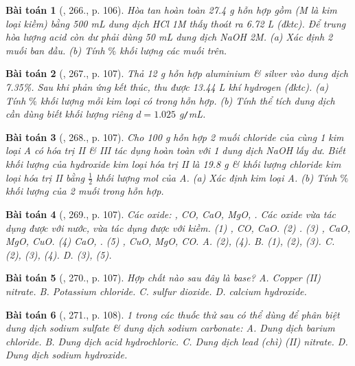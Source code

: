 \documentclass{article}
\newtheorem{baitoan}{Bài toán}
\begin{document}
\begin{baitoan}[\cite{Nguyen_Buu_Can_500_BT_Hoa_Hoc_THCS}, 266., p. 106]
	Hòa tan hoàn toàn {\rm27.4 g} hỗn hợp gồm {\rm{}} ({\rm M} là kim loại kiềm) bằng {\rm500 mL} dung dịch {\rm HCl 1M} thấy thoát ra {\rm6.72 L } (đktc). Để trung hòa lượng acid còn dư phải dùng {\rm50 mL} dung dịch {\rm NaOH 2M}. (a) Xác định 2 muối ban đầu. (b) Tính $\%$ khối lượng các muối trên.
\end{baitoan}

\begin{baitoan}[\cite{Nguyen_Buu_Can_500_BT_Hoa_Hoc_THCS}, 267., p. 107]
	Thả {\rm12 g} hỗn hợp aluminium \& silver vào dung dịch {\rm{} 7.35\%}. Sau khi phản ứng kết thúc, thu được {\rm13.44 L} khí hydrogen (đktc). (a) Tính $\%$ khối lượng mỗi kim loại có trong hỗn hợp. (b) Tính thể tích dung dịch {\rm{}} cần dùng biết khối lượng riêng $d = 1.025$ {\rm g{\tt/}mL}.
\end{baitoan}

\begin{baitoan}[\cite{Nguyen_Buu_Can_500_BT_Hoa_Hoc_THCS}, 268., p. 107]
	Cho {\rm100 g} hỗn hợp 2 muối chloride của cùng 1 kim loại A có hóa trị {\rm II \& III} tác dụng hoàn toàn với 1 dung dịch {\rm NaOH} lấy dư. Biết khối lượng của hydroxide kim loại hóa trị {\rm II} là {\rm19.8 g} \& khối lượng chloride kim loại hóa trị {\rm II} bằng $\frac{1}{2}$ khối lượng mol của A. (a) Xác định kim loại A. (b) Tính $\%$ khối lượng của 2 muối trong hỗn hợp.
\end{baitoan}

\begin{baitoan}[\cite{Nguyen_Buu_Can_500_BT_Hoa_Hoc_THCS}, 269., p. 107]
	Các oxide: {\rm{}, CO, CaO, MgO, }. Các oxide vừa tác dụng được với nước, vừa tác dụng được với kiềm. {\rm(1) , CO, CaO. (2) . (3) , CaO, MgO, CuO. (4) CaO, . (5) , CuO, MgO, CO. {\sf A.} (2), (4). {\sf B.} (1), (2), (3). {\sf C.} (2), (3), (4). {\sf D.} (3), (5).}
\end{baitoan}

\begin{baitoan}[\cite{Nguyen_Buu_Can_500_BT_Hoa_Hoc_THCS}, 270., p. 107]
	Hợp chất nào sau đây là base? {\sf A.} Copper ({\rm II}) nitrate. {\sf B.} Potassium chloride. {\sf C.} sulfur dioxide. {\sf D.} calcium hydroxide.
\end{baitoan}

\begin{baitoan}[\cite{Nguyen_Buu_Can_500_BT_Hoa_Hoc_THCS}, 271., p. 108]
	1 trong các thuốc thử sau có thể dùng để phân biệt dung dịch sodium sulfate \& dung dịch sodium carbonate: {\sf A.} Dung dịch barium chloride. {\sf B.} Dung dịch acid hydrochloric. {\sf C.} Dung dịch lead (chì) ({\rm II}) nitrate. {\sf D.} Dung dịch sodium hydroxide.
\end{baitoan}
\end{document}
